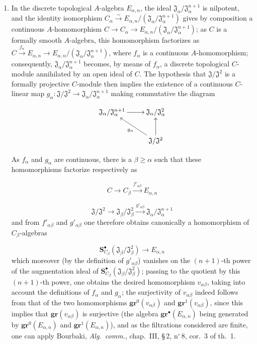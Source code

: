 \label{0.19.5.6.4-proof}
\begin{enumerate}
  \item[\rm(i)] In the discrete topological $A$-algebra $E_{\alpha,n}$, the ideal $\mathfrak{J}_\alpha/\mathfrak{J}_\alpha^{n+1}$ is nilpotent, and the identity isomorphism $C_\alpha\xrightarrow{\sim}E_{\alpha,n}/(\mathfrak{J}_\alpha/\mathfrak{J}_\alpha^{n+1})$ gives by composition a continuous $A$-homomorphism $C\to C_\alpha\to E_{\alpha,n}/(\mathfrak{J}_\alpha/\mathfrak{J}_\alpha^{n+1})$;
  as $C$ is a formally smooth $A$-algebra, this homomorphism factorizes as $C\xrightarrow{f_\alpha}E_{\alpha,n}\to E_{\alpha,n}/(\mathfrak{J}_\alpha/\mathfrak{J}_\alpha^{n+1})$,
  where $f_\alpha$ is a continuous $A$-homomorphism;
  consequently, $\mathfrak{J}_\alpha/\mathfrak{J}_\alpha^{n+1}$ becomes, by means of $f_\alpha$, a discrete topological $C$-module annihilated by an open ideal of $C$.
  The hypothesis that $\mathfrak{J}/\mathfrak{J}^2$ is a formally projective $C$-module then implies the existence of a continuous $C$-linear map $g_\alpha:\mathfrak{J}/\mathfrak{J}^2\to\mathfrak{J}_\alpha/\mathfrak{J}_\alpha^{n+1}$ making commutative the diagram
  
\[
\xymatrix{
      \mathfrak{J}_\alpha/\mathfrak{J}_\alpha^{n+1} \ar[r] & \mathfrak{J}_\alpha/\mathfrak{J}_\alpha^2 \\
      & \mathfrak{J}/\mathfrak{J}^2 \ar[ul]^{g_\alpha} \ar[u]
    }
\]


  As $f_\alpha$ and $g_\alpha$ are continuous, there is a $\beta\geq\alpha$ such that these homomorphisms factorize respectively as
  
\[
C\to C_\beta\xrightarrow{f'_{\alpha\beta}}E_{\alpha,n}
\]

  
\[
\mathfrak{J}/\mathfrak{J}^2\to\mathfrak{J}_\beta/\mathfrak{J}_\beta^2\xrightarrow{g'_{\alpha\beta}}\mathfrak{J}_\alpha/\mathfrak{J}_\alpha^{n+1}
\]
  and from $f'_{\alpha\beta}$ and $g'_{\alpha\beta}$ one therefore obtains canonically a homomorphism of $C_\beta$-algebras
  
\[
\mathbf{S}_{C_\beta}^\bullet(\mathfrak{J}_\beta/\mathfrak{J}_\beta^2) \to E_{\alpha,n}
\]
  which moreover (by the definition of $g'_{\alpha\beta}$) vanishes on the $(n+1)$-th power of the augmentation ideal of $\mathbf{S}_{C_\beta}^\bullet(\mathfrak{J}_\beta/\mathfrak{J}_\beta^2)$; passing to the quotient by this $(n+1)$-th power, one obtains the desired homomorphism $v_{\alpha\beta}$, taking into account the definitions of $f_\alpha$ and $g_\alpha$;
  the surjectivity of $v_{\alpha\beta}$ indeed follows from that of the two homomorphisms $\mathbf{gr}^0(v_{\alpha\beta})$ and $\mathbf{gr}^1(v_{\alpha\beta})$,
  since this implies that $\mathbf{gr}(v_{\alpha\beta})$ is surjective (the algebra $\mathbf{gr}^\bullet(E_{\alpha,n})$ being generated by $\mathbf{gr}^0(E_{\alpha,n})$ and $\mathbf{gr}^1(E_{\alpha,n})$), and
  as the filtrations considered are finite, one can apply Bourbaki, \emph{Alg.\ comm.}, chap.~III, \S\,2, n$^\circ$\,8, cor.~3 of th.~1.


\end{enumerate}
